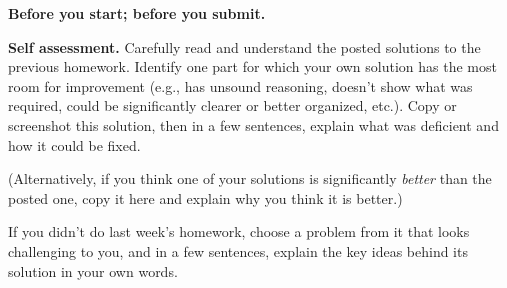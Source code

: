 \documentclass[11pt,addpoints,answers]{exam}
\begin{document}

\hwpreface


\begin{questions}

  \addtocounter{question}{-1}
  \question[0] \textbf{Before you start; before you submit.} \nopagebreak


  \question[10] \textbf{Self assessment.} \nopagebreak
  Carefully read and understand the posted solutions to the previous homework.
  Identify one part for which your own solution has the most room for improvement (e.g., has unsound reasoning, doesn’t show what was required, could be significantly clearer or better organized, etc.).
  Copy or screenshot this solution, then in a few sentences, explain what was deficient and how it could be fixed.

  (Alternatively, if you think one of your solutions is significantly \emph{better} than the posted one, copy it here and explain why you think it is better.)

  If you didn't do last week's homework, choose a problem from it that looks challenging to you, and in a few sentences, explain the key ideas behind its solution in your own words.


\end{questions}
\end{document}
